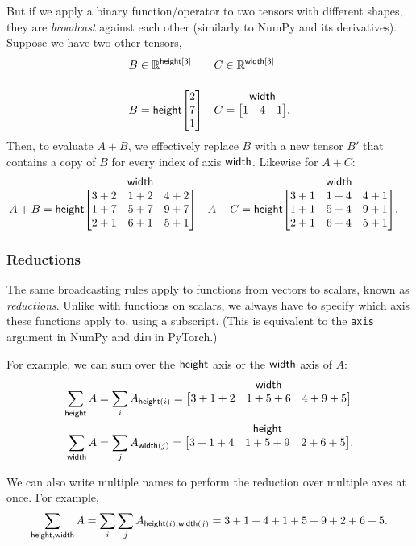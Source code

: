 \documentclass{article}
\makeatletter
\newcommand{\nmatrix}[3]{\name{#1}\begin{array}[b]{@{}c@{}}\name{#2}\\\begin{bmatrix}#3\end{bmatrix}\end{array}}
\newcommand{\reals}{\mathbb{R}}
\makeatother
\begin{document}
But if we apply a binary function/operator to two tensors with different shapes, they are \emph{broadcast} against each other (similarly to NumPy and its derivatives). Suppose we have two other tensors,
\begin{align*}
  B &\in \reals^{\nset{height}{3}} & C &\in \reals^{\nset{width}{3}} \\
  B &= \nmatrix{height}{}{
    2 \\ 7 \\ 1
  } & 
  C &= \nmatrix{}{width}{
    1 & 4 & 1
  }.
\end{align*}
Then, to evaluate $A+B$, we effectively replace $B$ with a new tensor $B'$ that contains a copy of $B$ for every index of axis $\mathsf{width}$. Likewise for $A+C$:
\begin{align*}
A + B &= \nmatrix{height}{width}{
  3+2 & 1+2 & 4+2 \\
  1+7 & 5+7 & 9+7 \\
  2+1 & 6+1 & 5+1
} &
A + C &= \nmatrix{height}{width}{
  3+1 & 1+4 & 4+1 \\
  1+1 & 5+4 & 9+1 \\
  2+1 & 6+4 & 5+1
}.
\end{align*}

\subsubsection{Reductions}
\label{sec:reductions}

The same broadcasting rules apply to functions from vectors to scalars, known as \emph{reductions}. Unlike with functions on scalars, we always have to specify which axis these functions apply to, using a subscript. (This is equivalent to the \verb|axis| argument in NumPy and \verb|dim| in PyTorch.)

For example, we can sum over the $\mathsf{height}$ axis or the $\mathsf{width}$ axis of $A$:
\begin{align*}
\nsum{height} A &= \sum_i A_{\nidx{height}{i}} = \nmatrix{}{width}{
  3+1+2 & 1+5+6 & 4+9+5
}
\\
\nsum{width} A &= \sum_j A_{\nidx{width}{j}} = \nmatrix{}{height}{
  3+1+4 & 1+5+9 & 2+6+5
}.
\end{align*}

We can also write multiple names to perform the reduction over multiple axes at once. For example,
\begin{equation*}
  \sum\limits_{\mathsf{height,width}} A = \sum_i \sum_j A_{\mathsf{height}(i),\mathsf{width}(j)} = 3+1+4+1+5+9+2+6+5.
\end{equation*}
\end{document}
